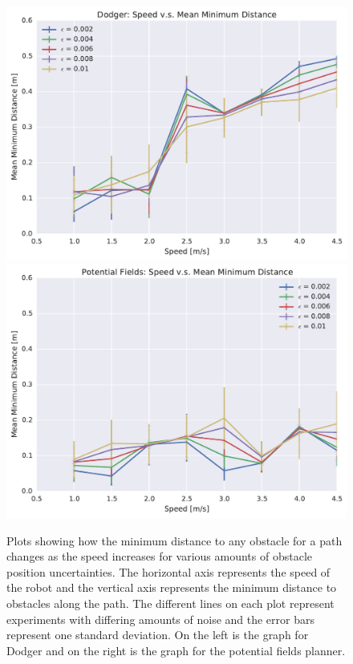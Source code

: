 \begin{figure}[h!]
    \centering
    \includegraphics[width=0.48\linewidth]{figs/planner_mean_min_distance_0}
    \includegraphics[width=0.48\linewidth]{figs/pf_mean_min_distance_0}

    \caption{Plots showing how the minimum distance to any obstacle for a path
        changes as the speed increases for various amounts of obstacle position
        uncertainties.  The horizontal axis represents the speed of the robot
        and the vertical axis represents the minimum distance to obstacles
        along the path. The different lines on each plot represent experiments
    with differing amounts of noise and the error bars represent one standard
deviation. On the left is the graph for Dodger and on the right is the graph
for the potential fields planner.}

    \label{fig:plot_min_distance}
\end{figure}


